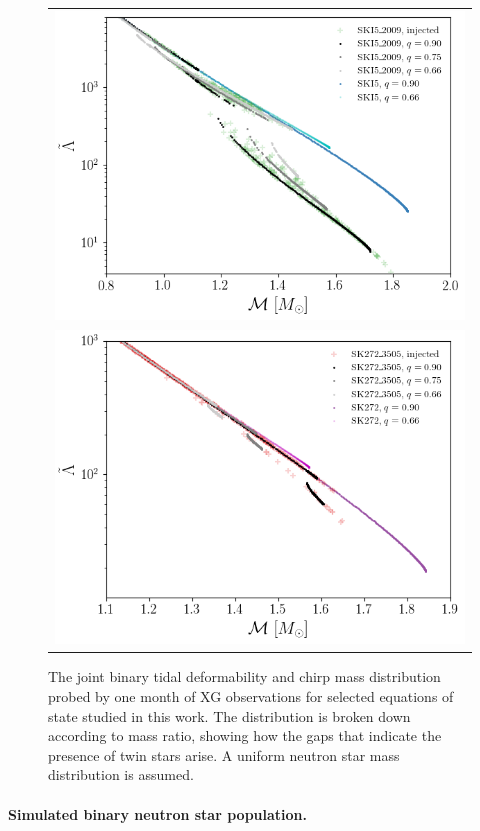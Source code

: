 \documentclass[aps,prl,twocolumn,superscriptaddress,footinbib]{revtex4-1}
\begin{document}
\begin{figure}[b]
    \begin{tabular}{c}
      \includegraphics[width=0.9\columnwidth]{SKI52009_sm.png} \\
      \includegraphics[width=0.9\columnwidth]{SK2723505_sm.png}
    \end{tabular}
    \caption{The joint binary tidal deformability and chirp mass distribution probed by one month of XG observations for selected equations of state studied in this work. The distribution is broken down according to mass ratio, showing how the gaps that indicate the presence of twin stars arise. A uniform neutron star mass distribution is assumed.}
    \label{fig:lambdapop2}
\end{figure}

\paragraph{Simulated binary neutron star population.}
\end{document}
